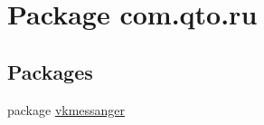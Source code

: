 \hypertarget{namespacecom_1_1qto_1_1ru}{}\section{Package com.\+qto.\+ru}
\label{namespacecom_1_1qto_1_1ru}
\subsection*{Packages}
\begin{DoxyCompactItemize}
\item 
package \hyperlink{namespacecom_1_1qto_1_1ru_1_1vkmessanger}{vkmessanger}
\end{DoxyCompactItemize}
